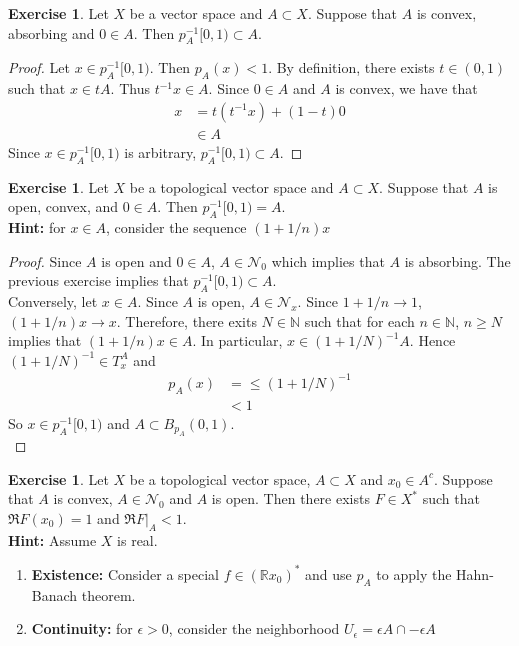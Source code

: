 \documentclass[12pt]{amsart}
\theoremstyle{definition}
\newtheorem{ex}[definition]{Exercise}
\newcommand{\ep}{\epsilon}
\newcommand{\N}{\mathbb{N}}
\newcommand{\R}{\mathbb{R}}
\newcommand{\MN}{\mathcal{N}}
\newcommand{\tbf}[1]{\textbf{#1}}
\DeclareMathOperator*{\0}{\mbf{0}}
\DeclareMathOperator*{\1}{\mbf{1}}
\begin{document}
	\begin{ex}
		Let $X$ be a vector space and $A \subset X$. Suppose that $A$ is convex, absorbing and $0 \in A$. Then $p_A^{-1}[0, 1) \subset A$. 
	\end{ex}

	\begin{proof}
		Let $x \in p_A^{-1}[0, 1)$. Then $p_A(x) < 1$. By definition, there exists $t \in (0,1)$ such that $x \in tA$. Thus $t^{-1}x \in A$. Since $0 \in A$ and $A$ is convex, we have that 
		\begin{align*}
			x
			&= t (t^{-1}x) + (1-t)0 \\
			& \in A
		\end{align*}
	 	Since $x \in p_A^{-1}[0, 1)$ is arbitrary, $p_A^{-1}[0, 1) \subset A$.
	\end{proof}

		\begin{ex}
		Let $X$ be a topological vector space and $A \subset X$. Suppose that $A$ is open, convex, and $0 \in A$. Then $p_A^{-1}[0, 1) = A$.\\
		\tbf{Hint:} for $x \in A$, consider the sequence $(1 + 1/n)x$
	\end{ex}
	
	\begin{proof}
		Since $A$ is open and $0 \in A$, $A \in \MN_0$ which implies that $A$ is absorbing. The previous exercise implies that $p_A^{-1}[0, 1) \subset A$. \\
		Conversely, let $x \in A$. Since $A$ is open, $A \in \MN_x$. Since $1 + 1/n \rightarrow 1$, $(1 + 1/n)x \rightarrow x$. Therefore, there exits $N \in \N$ such that for each $n \in \N$, $n \geq N$ implies that $(1 + 1/n)x \in A$. In particular, $x \in (1 + 1/N)^{-1}A$. Hence $(1 + 1/N)^{-1} \in T_x^A$ and
		\begin{align*}
			p_A(x)
			&= \leq (1 + 1/N)^{-1} \\
			& < 1
		\end{align*}
		So $x \in p_A^{-1}[0, 1)$ and $A \subset B_{p_A}(0,1)$. \\
	\end{proof}

	\begin{ex}
		Let $X$ be a topological vector space, $A \subset X$ and $x_0 \in A^c$. Suppose that $A$ is convex, $A \in \MN_0$ and $A$ is open. Then there exists $F \in X^*$ such that $\Re F(x_0) =1$ and $\Re F|_A < 1$. \\
		\tbf{Hint:} Assume $X$ is real.
		\begin{enumerate}
			\item \tbf{Existence:} Consider a special $f \in (\R x_0)^*$ and use $p_A$ to apply the Hahn-Banach theorem.
			\item \tbf{Continuity:} for $\ep > 0$, consider the neighborhood $U_{\ep} = \ep A \cap - \ep A$
		\end{enumerate} 
	\end{ex}
\end{document}
